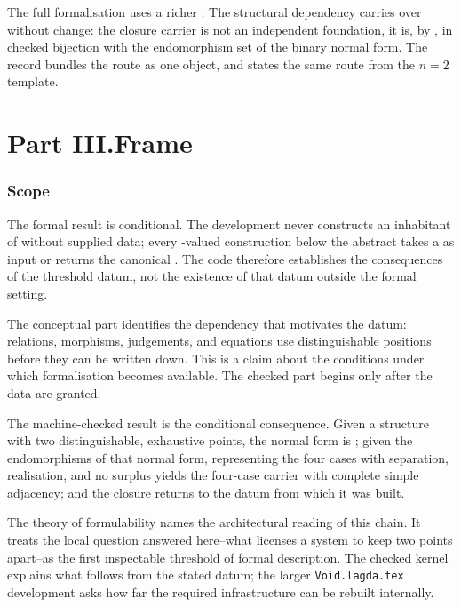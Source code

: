 \documentclass[11pt]{article}
\begin{document}
The full formalisation uses a richer .  The
structural dependency carries over without change: the closure carrier
is not an independent foundation, it is, by
, in checked bijection with
the endomorphism set of the binary normal form.  The record
 bundles the route as one
object, and  states the
same route from the $n=2$ template.

\part*{Part III.\quad Frame}

\section{Scope}

The formal result is conditional.  The development never constructs an
inhabitant of  without supplied data; every
-valued construction below the abstract takes a
 as input or returns the canonical
.  The code therefore establishes the
consequences of the threshold datum, not the existence of that datum
outside the formal setting.

The conceptual part identifies the dependency that motivates the datum:
relations, morphisms, judgements, and equations use distinguishable
positions before they can be written down.  This is a claim about the
conditions under which formalisation becomes available.  The checked
part begins only after the data are granted.

The machine-checked result is the conditional consequence.  Given a
structure with two distinguishable, exhaustive points, the normal form
is ; given the endomorphisms of that normal form,
representing the four cases with separation, realisation, and no surplus
yields the four-case carrier with complete simple adjacency; and the
closure returns to the datum from which it was built.

The theory of formulability names the architectural reading of this
chain.  It treats the local question answered here--what licenses a
system to keep two points apart--as the first inspectable threshold of
formal description.  The checked kernel explains what follows from the
stated datum; the larger \texttt{Void.lagda.tex} development asks how
far the required infrastructure can be rebuilt internally.
\end{document}
